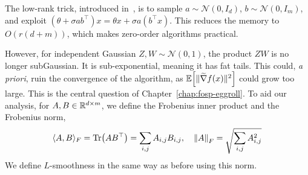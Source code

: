 The low-rank trick, introduced in~\cite{sarkar2025evolution}, is to sample $a \sim \mathcal N(0,I_d)$, $b \sim \mathcal N(0, I_m)$, and exploit $(\theta + \sigma ab^\top)x = \theta x + \sigma a(b^\top x)$. This reduces the memory to $O(r(d+m))$, which makes zero-order algorithms practical.

However, for independent Gaussian $Z,W \sim \mathcal N(0,1)$, the product $ZW$ is no longer subGaussian. It is sub-exponential, meaning it has fat tails. This could, \textit{a priori}, ruin the convergence of the algorithm, as $\mathbb{E}\qty[\|\widetilde{\nabla} f(x)\|^2]$ could grow too large. This is the central question of Chapter~\ref{chap:fosp-eggroll}. To aid our analysis, for $A,B \in \mathbb{R}^{d \times m}$, we define the Frobenius inner product and the Frobenius norm,
\begin{align*}
    \langle A, B \rangle_F = \Tr(AB^\top) = \sum_{i,j} A_{i,j} B_{i,j}, \quad \left\lVert A \right\rVert_F = \sqrt{\sum_{i,j} A_{i,j}^2}
\end{align*}
We define $L$-smoothness in the same way as before using this norm. 

